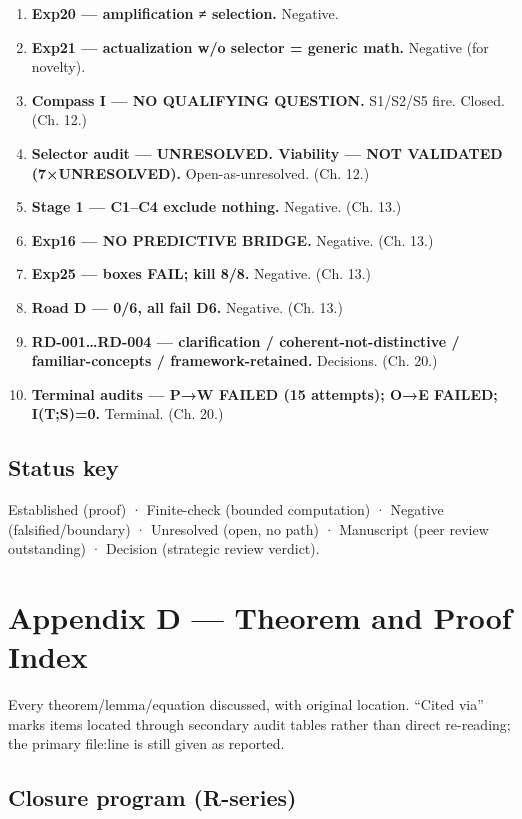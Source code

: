 \documentclass[
  11pt,
]{book}
\begin{document}
\begin{enumerate}
  \textbf{Exp19 --- plurality generic.} Zero residue. Negative.
\item
  \textbf{Exp20 --- amplification ≠ selection.} Negative.
\item
  \textbf{Exp21 --- actualization w/o selector = generic math.} Negative
  (for novelty).
\item
  \textbf{Compass I --- NO QUALIFYING QUESTION.} S1/S2/S5 fire. Closed.
  (Ch. 12.)
\item
  \textbf{Selector audit --- UNRESOLVED. Viability --- NOT VALIDATED
  (7×UNRESOLVED).} Open-as-unresolved. (Ch. 12.)
\item
  \textbf{Stage 1 --- C1--C4 exclude nothing.} Negative. (Ch. 13.)
\item
  \textbf{Exp16 --- NO PREDICTIVE BRIDGE.} Negative. (Ch. 13.)
\item
  \textbf{Exp25 --- boxes FAIL; kill 8/8.} Negative. (Ch. 13.)
\item
  \textbf{Road D --- 0/6, all fail D6.} Negative. (Ch. 13.)
\item
  \textbf{RD-001\ldots RD-004 --- clarification /
  coherent-not-distinctive / familiar-concepts / framework-retained.}
  Decisions. (Ch. 20.)
\item
  \textbf{Terminal audits --- P→W FAILED (15 attempts); O→E FAILED;
  I(T;S)=0.} Terminal. (Ch. 20.)
\end{enumerate}

\section{Status key}\label{status-key}

Established (proof) · Finite-check (bounded computation) · Negative
(falsified/boundary) · Unresolved (open, no path) · Manuscript (peer
review outstanding) · Decision (strategic review verdict).

\newpage

\chapter{Appendix D --- Theorem and Proof
Index}\label{appendix-d-theorem-and-proof-index}

Every theorem/lemma/equation discussed, with original location. ``Cited
via'' marks items located through secondary audit tables rather than
direct re-reading; the primary file:line is still given as reported.

\section{Closure program (R-series)}\label{closure-program-r-series}
\end{document}
